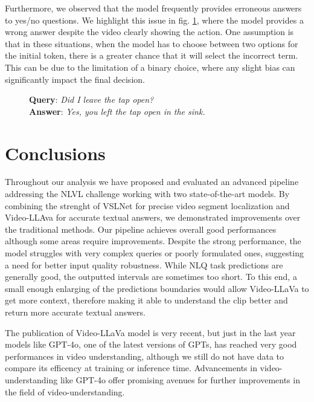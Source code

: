 \documentclass[10pt,twocolumn,letterpaper]{article}
\begin{document}
Furthermore, we observed that the model frequently provides erroneous answers to yes/no questions. We highlight this issue in fig. \ref{fig:animation3}, where the model provides a wrong answer despite the video clearly showing the action. One assumption is that in these situations, when the model has to choose between two options for the initial token, there is a greater chance that it will select the incorrect term. This can be due to the limitation of a binary choice, where any slight bias can significantly impact the final decision.

\begin{figure}[ht]
  \centering
  \captionsetup{justification=centering} %
      \caption{\textbf{Query}: \textit{Did I leave the tap open?} \\\textbf{Answer}: \textit{Yes, you left the tap open in the sink.}}
  \label{fig:animation3}
\end{figure}

\section{Conclusions}
Throughout our analysis we have proposed and evaluated an advanced pipeline addressing the NLVL challenge working with two state-of-the-art models. By combining the strenght of VSLNet for precise video segment localization and Video-LLAva for accurate textual answers, we demonstrated improvements over the traditional methods.
Our pipeline achieves overall good performances although some areas require improvements.
Despite the strong performance, the model struggles with very complex queries or poorly formulated ones, suggesting a need for better input quality robustness.
While NLQ task predictions are generally good, the outputted intervals are sometimes too short.
To this end, a small enough enlarging of the predictions boundaries would allow Video-LLaVa to get more context, therefore making it able to understand the clip better and return more accurate textual answers.

The publication of Video-LLaVa model is very recent, but just in the last year models like GPT-4o, one of the latest versions of GPTs, has reached very good performances in video understanding, although we still do not have data to compare its efficency at training or inference time.
Advancements in video-understanding like GPT-4o offer promising avenues for further improvements in the field of video-understanding.

{\small


}
\end{document}
